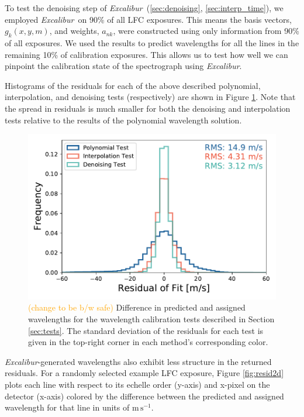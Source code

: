 \documentclass[modern]{aastex63}
\newcommand{\project}[1]{\textsl{#1}}
\newcommand{\name}{\project{Excalibur}}
\newcommand{\lz}[1]{\textcolor{orange}{#1}}
\newcommand{\mps}{\mathrm{m\,s^{-1}}}
\begin{document}
To test the denoising step of \name\ (\textsection \ref{sec:denoising}, \textsection\ref{sec:interp_time}), we employed \name\ on 90\% of all LFC exposures.  This means the basis vectors, $g_k(x,y,m)$,  and weights, $a_{nk}$, were constructed using only information from 90\% of all exposures.  We used the results to predict wavelengths for all the lines in the remaining 10\% of calibration exposures.  This allows us to test how well we can pinpoint the calibration state of the spectrograph using \name.

Histograms of the residuals for each of the above described polynomial, interpolation, and denoising tests (respectively) are shown in Figure \ref{fig:testHists}.  Note that the spread in residuals is much smaller for both the denoising and interpolation tests relative to the results of the polynomial wavelength solution.

\begin{figure}[h]
\centering
\includegraphics[width=.5\textwidth]{Figures/all_results.pdf}
\caption{\lz{(change to be b/w safe)} Difference in predicted and assigned wavelengths for the wavelength calibration tests described in Section \ref{sec:tests}.  The standard deviation of the residuals for each test is given in the top-right corner in each method's corresponding color.}
\label{fig:testHists}
\end{figure} 

\name -generated wavelengths also exhibit less structure in the returned residuals.  For a randomly selected example LFC exposure, Figure \ref{fig:resid2d} plots each line with respect to its echelle order (y-axis) and x-pixel on the detector (x-axis) colored by the difference between the predicted and assigned wavelength for that line in units of $\mps$.
\end{document}
